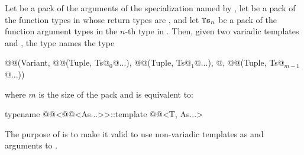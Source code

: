 \pnum
Let  be a pack of the arguments of
the  specialization named by ,
let  be a pack of the function types in 
whose return types are , and
let $\texttt{\protect Ts}_n$ be a pack of the function argument types
in the $n$-th type in .
Then, given two variadic templates  and ,
the type 
names the type
\begin{codeblock}
@@(Variant, @@(Tuple, Ts@$_0$@...),
                    @\itcorr[1]@(Tuple, Ts@$_1$@...),
                    @\itcorr[1]\ldots@,
                    @\itcorr[1]@(Tuple, Ts@$_{m-1}$@...))
\end{codeblock}
where $m$ is the size of the pack  and
 is equivalent to:
\begin{codeblock}
typename @@<@@<As...>>::template @@<T, As...>
\end{codeblock}

\pnum
\begin{note}
The purpose of  is to make it valid
to use non-variadic templates as  and  arguments
to .
\end{note}

